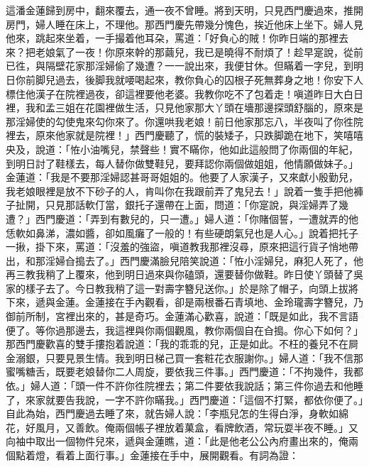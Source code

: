 這潘金蓮歸到房中，翻來覆去，通一夜不曾睡。將到天明，只見西門慶過來，推開房門，婦人睡在床上，不理他。那西門慶先帶幾分愧色，挨近他床上坐下。婦人見他來，跳起來坐着，一手撮着他耳朶，罵道：「好負心的賊！你昨日端的那裡去來？把老娘氣了一夜！你原來幹的那繭兒，我已是曉得不耐煩了！{}趁早寔說，從前已徃，與隔壁花家那淫婦偷了幾遭？一一說出來，我便甘休。但瞞着一字兒，到明日你前脚兒過去，後脚我就喓喝起來，教你負心的囚根子死無葬身之地！你安下人標住他漢子在院裡過夜，卻這裡要他老婆。我教你吃不了包着走！嗔道昨日大白日裡，我和孟三姐在花園裡做生活，只見他家那大丫頭在墻那邊探頭舒腦的，原來是那淫婦使的勾使鬼來勾你來了。你還哄我老娘！前日他家那忘八，半夜叫了你徃院裡去，原來他家就是院裡！」西門慶聽了，慌的裝矮子，只跌脚跪在地下，笑嘻嘻央及，{}說道：「恠小油嘴兒，禁聲些！實不瞞你，{}他如此這般問了你兩個的年紀，到明日討了鞋樣去，每人替你做雙鞋兒，要拜認你兩個做姐姐，他情願做妹子。」金蓮道：「我是不要那淫婦認甚哥哥姐姐的。他要了人家漢子，又來獻小殷勤兒，我老娘眼裡是放不下砂子的人，肯叫你在我跟前弄了鬼兒去！」說着一隻手把他褲子扯開，{}只見那話軟仃當，銀托子還帶在上面，問道：「你寔說，與淫婦弄了幾遭？」西門慶道：「弄到有數兒的，只一遭。」婦人道：「你賭個誓，{}一遭就弄的他恁軟如鼻涕，濃如醬，卻如風癱了一般的！有些硬朗氣兒也是人心。」說着把托子一揪，掛下來，罵道：「沒羞的強盜，嗔道教我那裡沒尋，原來把這行貨子悄地帶出，和那淫婦㒲搗去了。」{}西門慶滿臉兒陪笑說道：「恠小淫婦兒，麻犯人死了，他再三教我稍了上覆來，他到明日過來與你磕頭，{}還要替你做鞋。昨日使丫頭替了吳家的樣子去了。今日教我稍了這一對壽字簪兒送你。」於是除了帽子，向頭上拔將下來，遞與金蓮。金蓮接在手內觀看，卻是兩根番石青填地、金玲瓏壽字簪兒，乃御前所制，宮裡出來的，甚是奇巧。金蓮滿心歡喜，說道：「既是如此，我不言語便了。{}等你過那邊去，我這裡與你兩個觀風，教你兩個自在㒲搗。你心下如何？」那西門慶歡喜的雙手摟抱着說道：「我的乖乖的兒，正是如此。不枉的養兒不在屙金溺銀，只要見景生情。我到明日梯己買一套粧花衣服謝你。」婦人道：「我不信那蜜嘴糖舌，既要老娘替你二人周旋，要依我三件事。」西門慶道：「不拘幾件，我都依。」婦人道：「頭一件不許你徃院裡去；第二件要依我說話；第三件你過去和他睡了，來家就要告我說，一字不許你瞞我。」{}西門慶道：「這個不打緊，都依你便了。」自此為始，西門慶過去睡了來，就告婦人說：「李瓶兒怎的生得白淨，身軟如綿花，好風月，又善飲。俺兩個帳子裡放着菓盒，看牌飲酒，常玩耍半夜不睡。」又向袖中取出一個物件兒來，遞與金蓮瞧，道：「此是他老公公內府畫出來的，俺兩個點着燈，看着上面行事。」金蓮接在手中，展開觀看。有詞為證：

